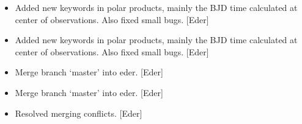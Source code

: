 \documentclass[a4paper,10pt,english]{report}
\begin{document}
\begin{itemize}
\item {} 
Added new keywords in polar products, mainly the BJD time calculated
at center of observations. Also fixed small bugs. {[}Eder{]}

\item {} 
Added new keywords in polar products, mainly the BJD time calculated
at center of observations. Also fixed small bugs. {[}Eder{]}

\item {} 
Merge branch ‘master’ into eder. {[}Eder{]}

\item {} 
Merge branch ‘master’ into eder. {[}Eder{]}

\item {} 
Resolved merging conflicts. {[}Eder{]}

\end{itemize}
\end{document}
